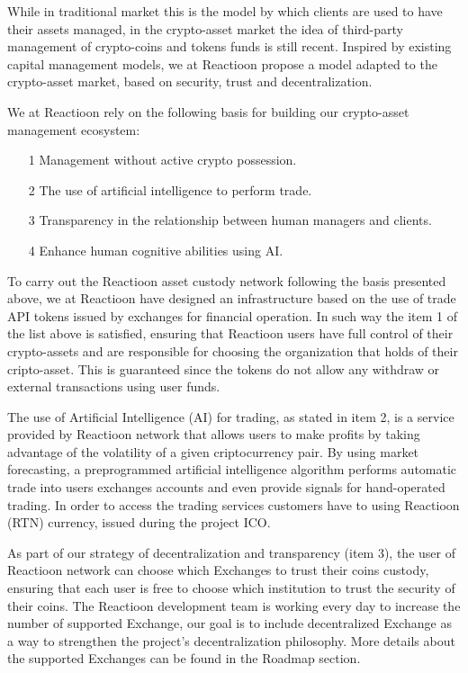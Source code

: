 \documentclass[
	article,			%
	12pt,				%
	oneside,			%
	a4paper,			%
	brazil,				%
	english,
	sumario=tradicional
	]{abntex2}
\begin{document}
While in traditional market this is the model by which clients are used to have their assets managed, in the crypto-asset market the idea of third-party management of crypto-coins and tokens funds is still recent. Inspired by existing capital management models, we at Reactioon propose a model adapted to the crypto-asset market, based on security, trust and decentralization.

We at Reactioon rely on the following basis for building our crypto-asset management ecosystem:

\begin{itemize}
    \item [1] Management without active crypto possession.
    \item [2] The use of artificial intelligence to perform trade.
    \item [3] Transparency in the relationship between human managers and clients.
    \item [4] Enhance human cognitive abilities using AI.
\end{itemize}
To carry out the Reactioon asset custody network following the basis presented above, we at Reactioon have designed an infrastructure based on the use of trade API tokens issued by exchanges for financial operation. In such way the item 1 of the list above is satisfied, ensuring that Reactioon users have full control of their crypto-assets and are responsible for choosing the organization that holds of their cripto-asset. This is guaranteed since the tokens do not allow any withdraw or external transactions using user funds.

The use of Artificial Intelligence (AI) for trading, as stated in item 2, is a service provided by Reactioon network that allows users to make profits by taking advantage of the volatility of a given criptocurrency pair. By using market forecasting, a preprogrammed artificial intelligence algorithm performs automatic trade into users exchanges accounts and even provide signals for hand-operated trading. In order to access the trading services customers have to using Reactioon (RTN) currency, issued during the project ICO.

As part of our strategy of decentralization and transparency (item 3), the user of Reactioon network can choose which Exchanges to trust their coins custody,  ensuring that each user is free to choose which institution to trust the security of their coins. The Reactioon development team is working every day to increase the number of supported Exchange, our goal is to include decentralized Exchange as a way to strengthen the project's decentralization philosophy. More details about the supported Exchanges can be found in the Roadmap section.
\end{document}
